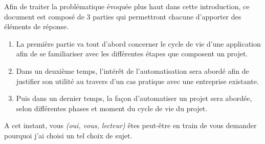 Afin de traiter la problématique évoquée plus haut dans cette introduction, ce document est composé de 3 parties qui permettront chacune d'apporter des éléments de réponse. 

\begin{enumerate}
	\item La première partie va tout d'abord concerner le cycle de vie d'une application afin de se familiariser avec les différentes étapes que composent un projet.
	\item Dans un deuxième temps, l'intérêt de l'automatisation sera abordé afin de justifier son utilité au travers d'un cas pratique avec une entreprise existante.
	\item Puis dans un dernier temps, la façon d'automatiser un projet sera abordée, selon différentes phases et moment du cycle de vie du projet.
\end{enumerate}

A cet instant, vous \emph{(oui, vous, lecteur)} êtes peut-être en train de vous demander pourquoi j'ai choisi un tel choix de sujet. 


